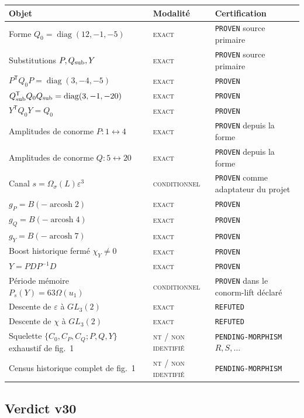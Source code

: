 \documentclass[11pt,a4paper]{article}
\newcommand{\statusExact}{\textsc{exact}}
\newcommand{\statusCond}{\textsc{conditionnel}}
\newcommand{\statusNT}{\textsc{nt / non identifié}}
\newcommand{\certProven}{\texttt{PROVEN}}
\newcommand{\certRefuted}{\texttt{REFUTED}}
\newcommand{\certPending}{\texttt{PENDING-MORPHISM}}
\begin{document}
\begin{longtable}{p{}p{}p{}}
\toprule
Objet & Modalité & Certification\\
\midrule
\endhead
Forme $Q_0=\operatorname{diag}(12,-1,-5)$ & \statusExact & \certProven{} source primaire\\
Substitutions $P,Q_{\rm sub},Y$ & \statusExact & \certProven{} source primaire\\
$P^{\mathsf T}Q_0P=\operatorname{diag}(3,-4,-5)$ & \statusExact & \certProven\\
$Q_{\rm sub}^{\mathsf T}Q_0Q_{\rm sub}=\operatorname{diag}(3,-1,-20)$ & \statusExact & \certProven\\
$Y^{\mathsf T}Q_0Y=Q_0$ & \statusExact & \certProven\\
Amplitudes de conorme $P:1\leftrightarrow4$ & \statusExact & \certProven{} depuis la forme\\
Amplitudes de conorme $Q:5\leftrightarrow20$ & \statusExact & \certProven{} depuis la forme\\
Canal $s=\Omega_\sigma(L)\varepsilon^3$ & \statusCond & \certProven{} comme adaptateur du projet\\
$g_P=B(-\operatorname{arcosh}2)$ & \statusExact & \certProven\\
$g_Q=B(-\operatorname{arcosh}4)$ & \statusExact & \certProven\\
$g_Y=B(-\operatorname{arcosh}7)$ & \statusExact & \certProven\\
Boost historique fermé $\chi_Y\neq0$ & \statusExact & \certProven\\
$Y=PDP^{-1}D$ & \statusExact & \certProven\\
Période mémoire $P_s(Y)=63\Omega(u_1)$ & \statusCond & \certProven{} dans le conorm-lift déclaré\\
Descente de $\varepsilon$ à $GL_3(2)$ & \statusExact & \certRefuted\\
Descente de $\chi$ à $GL_3(2)$ & \statusExact & \certRefuted\\
Squelette $\{C_0,C_P,C_Q;P,Q,Y\}$ exhaustif de fig.~1 & \statusNT & \certPending{} $R,S,\ldots$\\
Census historique complet de fig.~1 & \statusNT & \certPending\\
\bottomrule
\end{longtable}

\subsection{Verdict v30}
\end{document}
